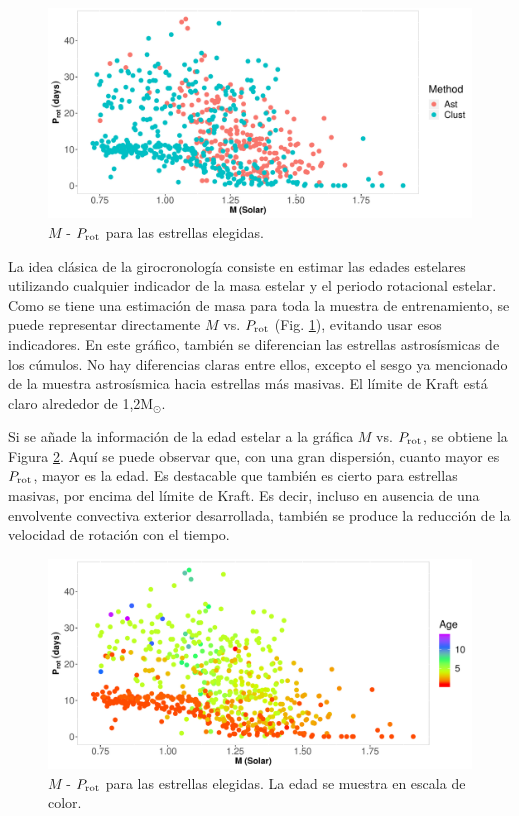 \begin{figure}[t]
\begin{center}
 \includegraphics[width=0.9\linewidth]{Figuras/M_Prot_embedded.pdf}
\end{center}
\caption{$M$ - $P_{\rm rot}$ para las estrellas elegidas.}
 \label{Fig:M_rot}
\end{figure}

La idea clásica de la girocronología consiste en estimar las edades estelares utilizando cualquier indicador de la masa estelar y el periodo rotacional estelar. Como se tiene una estimación de masa para toda la muestra de entrenamiento, se puede representar directamente $M$ vs. $P_{\rm rot}$ (Fig. \ref{Fig:M_rot}), evitando usar esos indicadores. En este gráfico, también se diferencian las estrellas astrosísmicas de los cúmulos. No hay diferencias claras entre ellos, excepto el sesgo ya mencionado de la muestra astrosísmica hacia estrellas más masivas. El límite de Kraft está claro alrededor de 1,2M$_\odot$.


Si se añade la información de la edad estelar a la gráfica $M$ vs. $P_{\rm rot}$, se obtiene la Figura \ref{Fig:M_Age_rot}. Aquí se puede observar que, con una gran dispersión, cuanto mayor es $P_{\rm rot}$, mayor es la edad. Es destacable que también es cierto para estrellas masivas, por encima del límite de Kraft. Es decir, incluso en ausencia de una envolvente convectiva exterior desarrollada, también se produce la reducción de la velocidad de rotación con el tiempo.

\begin{figure}[t]
\begin{center}
 \includegraphics[width=0.8\linewidth]{Figuras/M_Prot_Age_embedded.pdf}
\end{center}
\caption{$M$ - $P_{\rm rot}$ para las estrellas elegidas. La edad se muestra en escala de color.}
 \label{Fig:M_Age_rot}
\end{figure}


